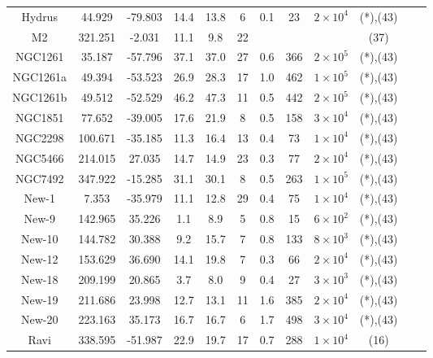 \begin{table}
\begin{tabular}{cSSSScSccccc}
Hydrus & 44.929 & -79.803 & 14.4 & 13.8 & 6 & 0.1 & 23 & $2 \times 10^{4}$ & (*),(43) \\
M2 & 321.251 & -2.031 & 11.1 & 9.8 & 22 & & & & (37) \\
NGC1261 & 35.187 & -57.796 & 37.1 & 37.0 & 27 & 0.6 & 366 & $2 \times 10^{5}$ & (*),(43) \\
NGC1261a & 49.394 & -53.523 & 26.9 & 28.3 & 17 & 1.0 & 462 & $1 \times 10^{5}$ & (*),(43) \\
NGC1261b & 49.512 & -52.529 & 46.2 & 47.3 & 11 & 0.5 & 442 & $2 \times 10^{5}$ & (*),(43) \\
NGC1851 & 77.652 & -39.005 & 17.6 & 21.9 & 8 & 0.5 & 158 & $3 \times 10^{4}$ & (*),(43) \\
NGC2298 & 100.671 & -35.185 & 11.3 & 16.4 & 13 & 0.4 & 73 & $1 \times 10^{4}$ & (*),(43) \\
NGC5466 & 214.015 & 27.035 & 14.7 & 14.9 & 23 & 0.3 & 77 & $2 \times 10^{4}$ & (*),(43) \\
NGC7492 & 347.922 & -15.285 & 31.1 & 30.1 & 8 & 0.5 & 263 & $1 \times 10^{5}$ & (*),(43) \\
New-1 & 7.353 & -35.979 & 11.1 & 12.8 & 29 & 0.4 & 75 & $1 \times 10^{4}$ & (*),(43) \\
New-9 & 142.965 & 35.226 & 1.1 & 8.9 & 5 & 0.8 & 15 & $6 \times 10^{2}$ & (*),(43) \\
New-10 & 144.782 & 30.388 & 9.2 & 15.7 & 7 & 0.8 & 133 & $8 \times 10^{3}$ & (*),(43) \\
New-12 & 153.629 & 36.690 & 14.1 & 19.8 & 7 & 0.3 & 66 & $2 \times 10^{4}$ & (*),(43) \\
New-18 & 209.199 & 20.865 & 3.7 & 8.0 & 9 & 0.4 & 27 & $3 \times 10^{3}$ & (*),(43) \\
New-19 & 211.686 & 23.998 & 12.7 & 13.1 & 11 & 1.6 & 385 & $2 \times 10^{4}$ & (*),(43) \\
New-20 & 223.163 & 35.173 & 16.7 & 16.7 & 6 & 1.7 & 498 & $3 \times 10^{4}$ & (*),(43) \\
Ravi & 338.595 & -51.987 & 22.9 & 19.7 & 17 & 0.7 & 288 & $1 \times 10^{4}$ & (16) \\
\hline \hline
\end{tabular}
\end{table}
